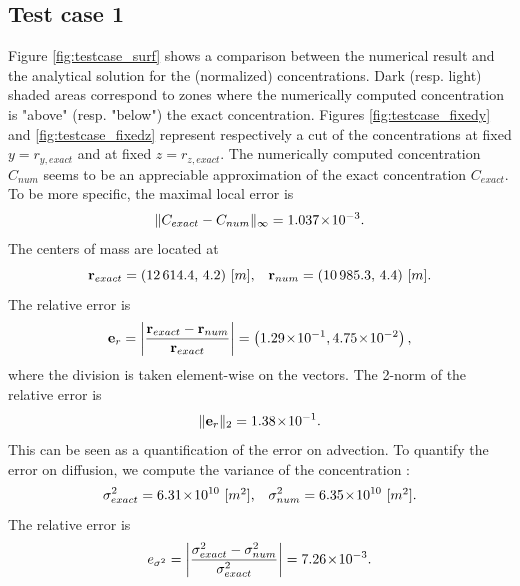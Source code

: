 \subsection{Test case 1}
Figure \ref{fig:testcase_surf} shows a comparison between the numerical result and the analytical solution for the (normalized) concentrations. Dark (resp. light) shaded areas correspond to zones where the numerically computed concentration is "above" (resp. "below") the exact concentration. Figures \ref{fig:testcase_fixedy} and \ref{fig:testcase_fixedz} represent respectively a cut of the concentrations at fixed $y = r_{y,exact}$ and at fixed $z = r_{z,exact}$. The numerically computed concentration $C_{num}$ seems to be an appreciable approximation of the exact concentration $C_{exact}$. To be more specific, the maximal local error is 
\begin{equation}
	\|C_{exact}-C_{num}\|_{\infty} = 1.037\!\times\!10^{-3}.
\end{equation}
The centers of mass are located at
\begin{equation}
	\mathbf r_{exact} = (12\,614.4,\,4.2) \mbox{ [$m$],}\quad \mathbf r_{num} = (10\,985.3,\,4.4) \mbox{ [$m$]}.
\end{equation}
The relative error is
\begin{equation}
	\mathbf e_r = \left \lvert \frac{\mathbf r_{exact}-\mathbf r_{num}}{\mathbf r_{exact}} \right \rvert =  \left(1.29\!\times\!10^{-1}, 4.75\!\times\!10^{-2}\right),
\end{equation}
where the division is taken element-wise on the vectors. The 2-norm of the relative error is
\begin{equation}
	\| \mathbf e_r \|_2 = 1.38\!\times\!10^{-1}.
\end{equation}
This can be seen as a quantification of the error on advection. To quantify the error on diffusion, we compute the variance of the concentration :
\begin{equation}
	\sigma^2_{exact} = 6.31\!\times\!10^{10} \mbox{ [$m^2$],}\quad \sigma^2_{num} = 6.35\!\times\!10^{10} \mbox{ [$m^2$].}
\end{equation}
The relative error is
\begin{equation}
	e_{\sigma^2} = \left \lvert \frac{\sigma^2_{exact}-\sigma^2_{num}}{\sigma^2_{exact}}\right \rvert = 7.26\!\times\!10^{-3}.
\end{equation}
